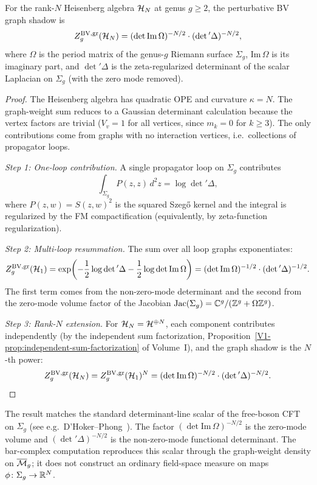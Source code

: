 \begin{theorem}
For the rank-$N$ Heisenberg algebra $\mathcal{H}_N$ at genus $g \geq 2$, the
perturbative BV graph shadow is
\[
Z_g^{\mathrm{BV,gr}}(\mathcal{H}_N)
 = (\det \mathrm{Im}\, \Omega)^{-N/2}
 \cdot (\det{}' \Delta)^{-N/2},
\]
where $\Omega$ is the period matrix of the genus-$g$ Riemann surface
$\Sigma_g$, $\mathrm{Im}\, \Omega$ is its imaginary part, and
$\det{}' \Delta$ is the zeta-regularized determinant of the scalar
Laplacian on $\Sigma_g$ (with the zero mode removed).
\end{theorem}

\begin{proof}
The Heisenberg algebra has quadratic OPE and curvature $\kappa = N$.
The graph-weight sum reduces to a Gaussian determinant calculation because the
vertex factors are trivial ($V_v = 1$ for all vertices, since $m_k = 0$
for $k \geq 3$). The only contributions come from graphs with no
interaction vertices, i.e.\ collections of propagator loops.

\emph{Step 1: One-loop contribution.} A single propagator loop on
$\Sigma_g$ contributes
\[
\int_{\Sigma_g} P(z, z)\, d^2 z = \log \det{}' \Delta,
\]
where $P(z, w) = S(z, w)^2$ is the squared Szeg\H{o} kernel and the
integral is regularized by the FM compactification (equivalently, by
zeta-function regularization).

\emph{Step 2: Multi-loop resummation.} The sum over all loop graphs
exponentiates:
\[
Z_g^{\mathrm{BV,gr}}(\mathcal{H}_1)
 = \exp\!\left(-\frac{1}{2} \log \det{}' \Delta
 - \frac{1}{2} \log \det \mathrm{Im}\, \Omega\right)
 = (\det \mathrm{Im}\, \Omega)^{-1/2}
 \cdot (\det{}' \Delta)^{-1/2}.
\]
The first term comes from the non-zero-mode determinant and the second
from the zero-mode volume factor of the Jacobian $\mathrm{Jac}(\Sigma_g)
= \mathbb{C}^g / (\mathbb{Z}^g + \Omega \mathbb{Z}^g)$.

\emph{Step 3: Rank-$N$ extension.} For $\mathcal{H}_N = \mathcal{H}^{\oplus N}$,
each component contributes independently (by the independent sum
factorization, Proposition~\ref*{V1-prop:independent-sum-factorization}
of Volume~I), and the graph shadow is the $N$-th power:
\[
Z_g^{\mathrm{BV,gr}}(\mathcal{H}_N)
 = Z_g^{\mathrm{BV,gr}}(\mathcal{H}_1)^N
 = (\det \mathrm{Im}\, \Omega)^{-N/2}
 \cdot (\det{}' \Delta)^{-N/2}.
\]
\end{proof}

\begin{remark}
The result matches the standard determinant-line scalar of the
free-boson CFT on $\Sigma_g$ (see e.g.\ D'Hoker--Phong~\cite{DhokerPhong}).
The factor $(\det \mathrm{Im}\, \Omega)^{-N/2}$ is the zero-mode volume
and $(\det{}' \Delta)^{-N/2}$ is the non-zero-mode functional
determinant. The bar-complex computation reproduces this scalar through
the graph-weight density on $\overline{\mathcal{M}}_g$; it does not construct an
ordinary field-space measure on maps
$\phi \colon \Sigma_g \to \mathbb{R}^N$.
\end{remark}

